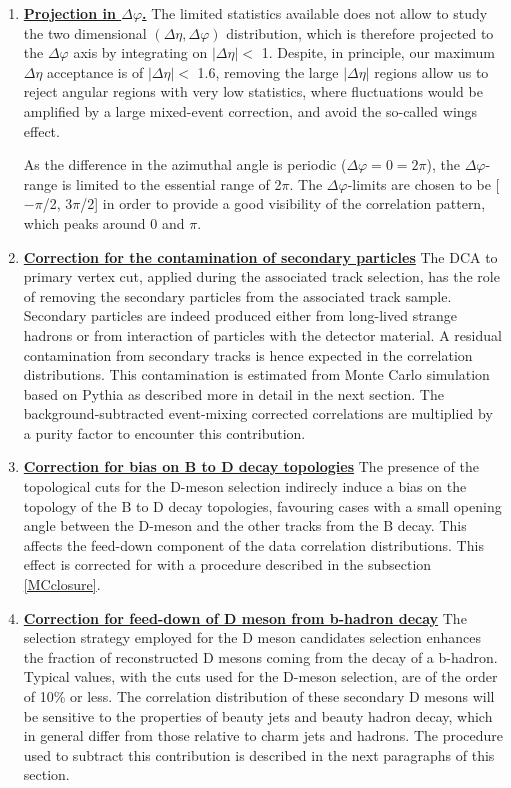 \begin{enumerate}
\item
\underline{\bf Projection in $\Delta\varphi$.}
The limited statistics available does not allow to study the two dimensional
$(\Delta\eta,\Delta\varphi)$ distribution, which is therefore projected to the $\Delta\varphi$ axis by integrating on $|\Delta\eta| <$ 1. Despite, in principle, our maximum $\Delta\eta$ acceptance is of $|\Delta\eta| <$ 1.6, removing the large $|\Delta\eta|$ regions allow us to reject angular regions with very low statistics, where fluctuations would be amplified by a large mixed-event correction, and avoid the so-called wings effect.

As the difference in the azimuthal angle is periodic ($\Delta \varphi = 0 = 2\pi$), the $\Delta\varphi$-range is limited to the essential range of 2$\pi$. The $\Delta \varphi$-limits are chosen to be [$-\pi$/2, 3$\pi$/2] in order to provide a good visibility of the correlation pattern, which peaks around 0 and $\pi$.

\item
\underline{\bf Correction for the contamination of secondary particles}
The DCA to primary vertex cut, applied during the associated track selection, has the role of removing the secondary particles from the associated track sample.
Secondary particles are indeed produced either from long-lived strange hadrons or from interaction of particles with the detector material. A residual contamination from secondary tracks is hence expected in the correlation distributions. This contamination is estimated from Monte Carlo simulation based on Pythia as described more in detail in the next section. The background-subtracted
event-mixing corrected correlations are multiplied by a purity factor to encounter this contribution.

\item
\underline{\bf Correction for bias on B to D decay topologies}
The presence of the topological cuts for the D-meson selection indirecly induce a bias on the topology of the B to D decay topologies, favouring cases with a small opening angle between the D-meson and the other tracks from the B decay. This affects the feed-down component of the data correlation distributions. This effect is corrected for with a procedure described in the subsection \ref{MCclosure}. %

\item
\underline{\bf Correction for feed-down of D meson from b-hadron decay}
The selection strategy employed for the D meson candidates selection %
enhances the fraction of reconstructed D mesons coming from the decay of a b-hadron. Typical values, with the cuts used for the D-meson selection, are of the order of 10\% or less. The correlation distribution of these secondary D mesons will be sensitive to the properties of beauty jets and beauty hadron decay, which in general differ from those relative to charm jets and hadrons. The procedure used to subtract this contribution is described in the next paragraphs of this section.


\end{enumerate}
